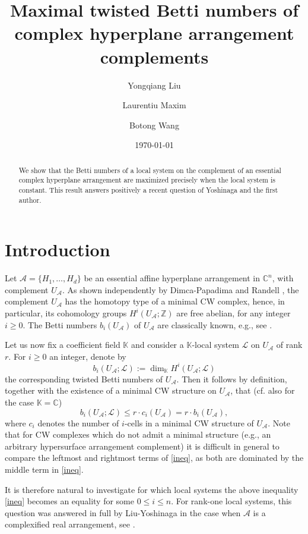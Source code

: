 \documentclass[12pt,leqno,twoside]{amsart}
\title[]{Maximal twisted Betti numbers of complex hyperplane arrangement complements}
\author{Yongqiang Liu}
\author{Laurentiu Maxim}
\author{Botong Wang}
\date{\today}
\theoremstyle{plain}
\theoremstyle{definition}
\newcommand{\C}{\mathbb{C}}
\newcommand{\Z}{\mathbb{Z}}
\newcommand{\K}{\mathbb{K}}
\newcommand{\sA}{\mathcal{A}}
\newcommand{\sL}{\mathcal{L}}
\begin{document}
\begin{abstract}
We show that the Betti numbers of a local system on the complement of an essential complex hyperplane arrangement are maximized precisely when the local system is constant. This result answers positively a recent question of Yoshinaga and the first author.
\end{abstract}

\maketitle

\section{Introduction}

Let $\sA=\{H_1,\ldots, H_d\}$ be an essential affine hyperplane arrangement in $\C^n$, with complement $U_\sA$. As shown independently by Dimca-Papadima \cite{DP} and Randell \cite{R}, the complement  $U_\sA$ has the homotopy type of a minimal CW complex, hence, in particular, its cohomology groups $H^i(U_\sA;\Z)$ are free abelian, for any integer $i \geq 0$. The Betti numbers $b_i(U_\sA)$ of $U_\sA$ are classically known, e.g., see \cite{OT}.

Let us now fix a coefficient field $\K$  and consider a $\K$-local system $\sL$ on $U_\sA$ of rank $r$. For $i \geq 0$ an integer, denote by 
\[
b_i(U_\sA;\sL):=\dim_\K H^i(U_\sA;\sL)
\]
the corresponding twisted Betti numbers of $U_\sA$. Then it follows by definition, together with the existence of a minimal CW structure on $U_\sA$, that (cf. also \cite{Coh98} for the case $\K=\C$)
\begin{equation}\label{ineq}
b_i(U_\sA;\sL) \leq r \cdot c_i(U_\sA)=r \cdot b_i(U_\sA),
\end{equation}
where $c_i$ denotes the number of $i$-cells in a minimal CW structure of $U_\sA$. Note that for CW complexes which do not admit a minimal structure (e.g., an arbitrary hypersurface arrangement complement) it is difficult in general to compare the leftmost and rightmost terms of \eqref{ineq}, as both are dominated by the middle term in \eqref{ineq}.

It is therefore natural to investigate for which local systems the above inequality \eqref{ineq}  becomes an equality for some $0 \leq i \leq n$. For rank-one local systems, this question was answered in full by Liu-Yoshinaga in the case when $\sA$ is a complexified real arrangement, see \cite[Theorem 1.1]{LY}.
\end{document}
